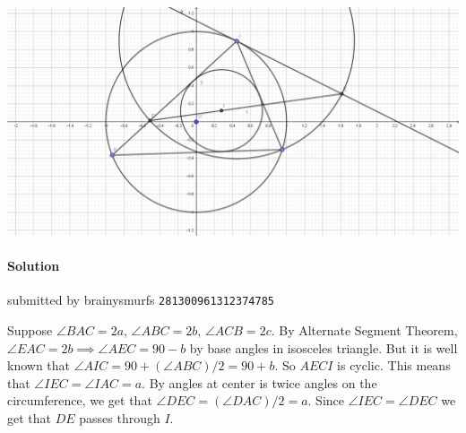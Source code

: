 \documentclass[10pt]{article}
\newcounter{solution}
\newcommand{\solution}[4][0]{
	\paragraph{Solution \arabic{solution}} \hfill submitted by #2 \hfill \texttt{#3}
	\begin{flushleft} #4 \end{flushleft}
	\addtocounter{solution}{1}
	\vspace{1em}
}
\begin{document}
\begin{center}
	\includegraphics[scale=0.25]{q47-diagram}
\end{center}

\solution[47]{brainysmurfs}{281300961312374785}{Suppose $\angle BAC = 2a$, $\angle ABC = 2b$, $\angle ACB = 2c$. By Alternate Segment Theorem, $\angle EAC = 2b \implies \angle AEC = 90 - b$ by base angles in isosceles triangle. But it is well known that $\angle AIC = 90 + (\angle ABC)/2 = 90 + b$. So $AECI$ is cyclic. This means that $\angle IEC = \angle IAC = a$. By angles at center is twice angles on the circumference, we get that $\angle DEC = (\angle DAC)/2 = a$. Since $\angle IEC = \angle DEC$ we get that $DE$ passes through $I$.}
\end{document}
